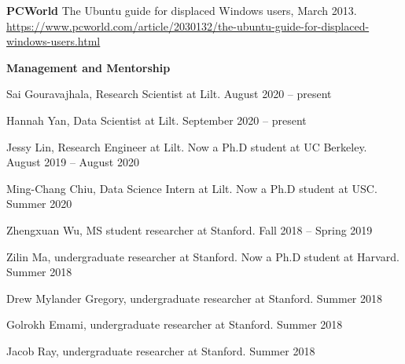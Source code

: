 \documentclass[10pt,A4]{article}
\newcommand{\cvsection}[1]
{
	\begin{center}
		\large\textcolor{sectcol}{\textbf{#1}}
	\end{center}
}
\newcommand{\mystrut}{\rule[-.3\baselineskip]{0pt}{\baselineskip}}
\begin{document}
\textbf{PCWorld} The Ubuntu guide for displaced Windows users, March 2013.\\
\url{https://www.pcworld.com/article/2030132/the-ubuntu-guide-for-displaced-windows-users.html}\\

\cvsection{Management and Mentorship}

Sai Gouravajhala, Research Scientist at Lilt. \hfill \textcolor{sectcol}{August 2020 -- present}

Hannah Yan, Data Scientist at Lilt. \hfill \textcolor{sectcol}{September 2020 -- present}

Jessy Lin, Research Engineer at Lilt. Now a Ph.D student at UC Berkeley. \hfill \textcolor{sectcol}{August 2019 -- August 2020}

Ming-Chang Chiu, Data Science Intern at Lilt. Now a Ph.D student at USC. \hfill \textcolor{sectcol}{Summer 2020}

Zhengxuan Wu, MS student researcher at Stanford. \hfill \textcolor{sectcol}{Fall 2018 -- Spring 2019}

Zilin Ma, undergraduate researcher at Stanford. Now a Ph.D student at Harvard. \hfill \textcolor{sectcol}{Summer 2018}

Drew Mylander Gregory, undergraduate researcher at Stanford. \hfill \textcolor{sectcol}{Summer 2018}

Golrokh Emami, undergraduate researcher at Stanford. \hfill \textcolor{sectcol}{Summer 2018}

Jacob Ray, undergraduate researcher at Stanford. \hfill \textcolor{sectcol}{Summer 2018}\\





%
%
%
%
%
%
\end{document}
